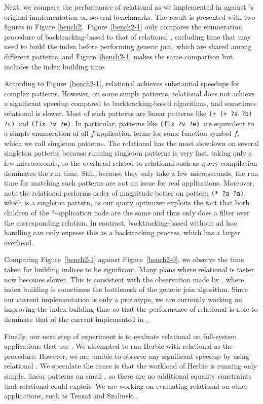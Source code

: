 Next, we compare the performance of relational \ematching as we implemented in \egg against \egg's original \ematching implementation on several benchmarks. The result is presented with two figures in Figure \ref{bench2}. Figure~\ref{bench2-1} only compares the enumeration procedure of backtracking-based \ematching to that of relational \ematching, excluding time that may need to build the index before performing generic join, which are shared among different patterns, and Figure~\ref{bench2-1} makes the same comparison but includes the index building time.

According to Figure~\ref{bench2-1}, relational \ematching achieves substantial speedups for complex patterns. However, on some simple patterns, relational \ematching does not achieve a significant speedup compared to backtracking-based \ematching algorithms, and sometimes relational \ematching is slower.
Most of such patterns are linear patterns like \texttt{(+ (+ ?a ?b) ?c)} and \texttt{(fix ?v ?e)}. In particular, patterns like \texttt{(fix ?v ?e)} are equivalent to a simple enumeration of all $f$-application terms for some function symbol $f$, which we call singleton patterns. The relational \ematching has the most slowdown on several singleton patterns because running singleton patterns is very fast, taking only a few microseconds, so the overhead related to relational \ematching such as query compilation dominates the run time. Still, because they only take a few microseconds, the run time for matching such patterns are not an issue for real applications. Moreover,  note the relational \ematching performs order of magnitude  better on pattern \texttt{(* ?a ?a)}, which is a singleton pattern, as our query optimizer exploits the fact that both children of the *-application node are the same and thus only does a filter over the corresponding relation. In contrast, backtracking-based \ematching without ad hoc handling can only express this as a backtracking process, which has a larger overhead.

Comparing Figure~\ref{bench2-1} against  Figure~\ref{bench2-0}, we observe the time taken for building indices to be significant. Many plans where relational \ematching is faster now becomes slower. This is consistent with the observation made by \cite{eval-wcoj}, where index building is sometimes the bottleneck of the generic join algorithm. Since our current implementation is only a prototype, we are currently working on improving the index building time so that the performance of relational \ematching is able to dominate that of the current implemented \ematching in \egg.
 
Finally, our next step of experiment is to evaluate relational \ematching on full-system applications that use \egg. We attempted to run Herbie with relational \ematching as the \ematching procedure. However, we are unable to observe any significant speedup by using relational \ematching. We speculate the cause is that the workload of Herbie is running only simple, linear patterns on small \egraphs, so there are no additional equality constraints that relational \ematching could exploit. We are working on evaluating relational \ematching on other applications, such as Tensat \citep{tensat} and Szalinski \citep{2020-pldi-szalinski-cad-eqsat}.